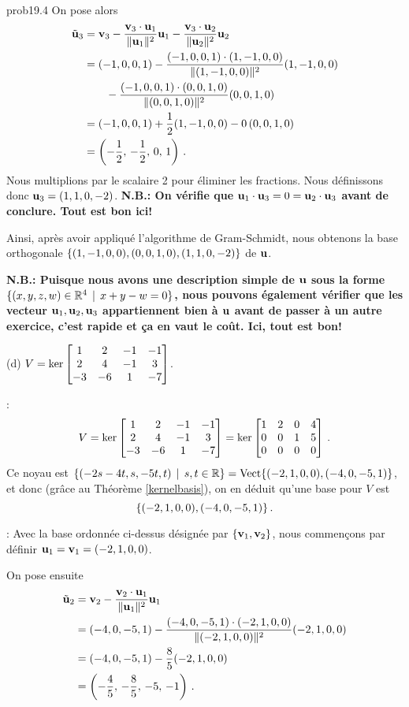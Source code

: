 \begin{sol}{prob19.4}
On pose alors
\begin{align*}
 \tilde {\mathbf{u}}_3 &=\mathbf{v}_3 -\frac{\mathbf{v}_3\cdot \mathbf{u}_1}{\| \mathbf{u}_1\|^2}\mathbf{u}_1-\frac{\mathbf{v}_3\cdot \mathbf{u}_2}{\| \mathbf{u}_2\|^2}\mathbf{u}_2 \\
  &= (-1,0,0,1)-\frac{(-1,0,0,1)\cdot (1, -1, 0, 0)}{\| (1, -1, 0, 0)\|^2}(1, -1, 0, 0)\\
&\qquad-\frac{(-1,0,0,1)\cdot (0,0,1,0)}{\| (0,0,1,0)\|^2}(0,0,1,0)\\
  &=(-1,0,0,1)+\frac12 (1, -1, 0, 0)-0\,(0,0,1,0)\\
  &= \left(-\frac12,\,-\frac12  ,\, 0 ,\,1 \right)\,.\end{align*}
Nous multiplions par le scalaire 2 pour éliminer les fractions. Nous définissons donc  $\mathbf{u}_3=(1,1,0,-2)$. 
 {\bf N.B.: On v\'erifie que $\mathbf{u}_1\cdot \mathbf{u}_3=0=\mathbf{u}_2\cdot \mathbf{u}_3$ avant de conclure. Tout est bon ici!}

Ainsi, après avoir appliqué l'algorithme de Gram-Schmidt, nous obtenons la base orthogonale $\{(1, -1, 0, 0),(0,0,1,0),(1,1,0,-2)\}$ de $\mathbf{u}$.

{\bf N.B.: Puisque nous avons une description simple de $\mathbf{u}$ sous la forme $\{(x,y,z, w)\in\mathbb{R}^4 \, \mid \, x+y-w=0\}$, nous pouvons également vérifier que les vecteur $\mathbf{u}_1, \mathbf{u}_2, \mathbf{u}_3$ appartiennent bien à $\mathbf{u}$ avant de passer \`a un autre exercice, c'est rapide et ça en vaut le coût. Ici, tout est bon!}
\medskip

(d) $V=\ker \bmatrix 1 & 2 & -1 & -1 \\
 2 & 4 & -1 & 3 \\
 -3 & -6 & 1 & -7 \endbmatrix$.


\soln {}: 
$$V=\ker \bmatrix 1 & 2 & -1 & -1 \\
 2 & 4 & -1 & 3 \\
 -3 & -6 & 1 & -7 \endbmatrix=\ker
\bmatrix 
1 & 2 & 0 & 4 \\
 0 & 0 & 1 & 5 \\
 0 & 0 & 0 & 0 \\ \endbmatrix\,.$$
Ce noyau est $\{(-2s-4t,s,-5t,t)\, \mid \, s,t \in \mathbb{R} \}=\operatorname{ Vect} \normalsize\{(-2,1,0,0),(-4,0,-5,1)\normalsize\} $, et donc (grâce au Théorème \ref{kernelbasis}), on en déduit qu'une base pour $V$ est 
$$\{(-2,1,0,0),(-4,0,-5,1)\}\,.$$

 : Avec la base ordonnée ci-dessus désignée par $\{\mathbf{v}_1, \mathbf{v}_2\}$, nous commençons par définir $\mathbf{u}_1=\mathbf{v}_1=(-2,1,0,0)$. 

On pose ensuite 
\begin{equation*}
\begin{split}
 \tilde {\mathbf{u}}_2 &= \mathbf{v}_2 -\frac{\mathbf{v}_2\cdot \mathbf{u}_1}{\| \mathbf{u}_1\|^2}\mathbf{u}_1\\
  &= (-4,0,-5,1)-\frac{(-4,0,-5,1)\cdot (-2,1,0,0)}{\| (-2,1,0,0)\|^2}(-2,1,0,0)\\
  &=(-4,0,-5,1)-\frac85(-2,1,0,0) \\
  &= \left(-\frac45,\,-\frac85,\, -5, \,-1 \right)\,.
\end{split}\end{equation*}


\end{sol}
